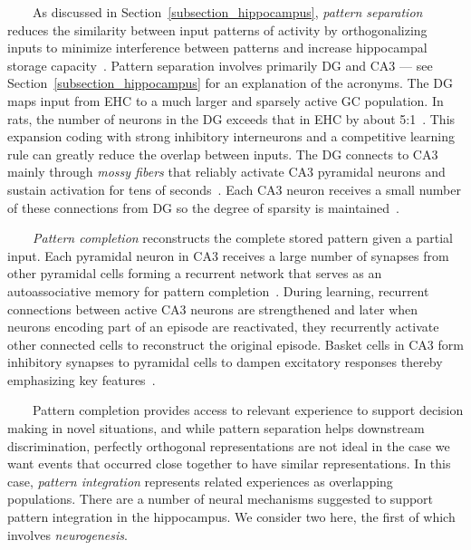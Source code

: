 \documentclass[letterpaper,11pt]{article}
\def\emdash{---}
\begin{document}

\begin{center}
  \begin{tcolorbox}[breakable,sharp corners=all,coltitle=black,colbacktitle=white,
    width=\textwidth,boxsep=5pt,left=5pt,right=5pt,
    title={\textbf{Box A: Pattern Separation, Completion and Integration}}]

~~~~As discussed in Section~\ref{subsection_hippocampus}, {\it{pattern separation}} reduces the similarity between input patterns of activity by orthogonalizing inputs to minimize interference between patterns and increase hippocampal storage capacity~\cite{KesnerandRollsNBR-15}. Pattern separation involves primarily DG and CA3 {\emdash{}} see Section~\ref{subsection_hippocampus} for an explanation of the acronyms. The DG maps input from EHC to a much larger and sparsely active GC population. In rats, the number of neurons in the DG exceeds that in EHC by about 5:1~\cite{DrewetalLEARNING-MEMORY-13}. This expansion coding with strong inhibitory interneurons and a competitive learning rule can greatly reduce the overlap between inputs. The DG connects to CA3 mainly through {\it{mossy fibers}} that reliably activate CA3 pyramidal neurons and sustain activation for tens of seconds~\cite{VyletaetalELIFE-16}. Each CA3 neuron receives a small number of these connections from DG so the degree of sparsity is maintained~\cite{KesnerandRollsNBR-15}.

~~~~{\it{Pattern completion}} reconstructs the complete stored pattern given a partial input. Each pyramidal neuron in CA3 receives a large number of synapses from other pyramidal cells forming a recurrent network that serves as an autoassociative memory for pattern completion~\cite{KesnerandRollsNBR-15}. During learning, recurrent connections between active CA3 neurons are strengthened and later when neurons encoding part of an episode are reactivated, they recurrently activate other connected cells to reconstruct the original episode. Basket cells in CA3 form inhibitory synapses to pyramidal cells to dampen excitatory responses thereby emphasizing key features~\cite{NeunuebelandKnierimNEURON-14}. 

~~~~Pattern completion provides access to relevant experience to support decision making in novel situations, and while pattern separation helps downstream discrimination, perfectly orthogonal representations are not ideal in the case we want events that occurred close together to have similar representations. In this case, {\it{pattern integration}} represents related experiences as overlapping populations. There are a number of neural mechanisms suggested to support pattern integration in the hippocampus. We consider two here, the first of which involves {\it{neurogenesis}}. 


\end{tcolorbox}
\end{center}
\end{document}
